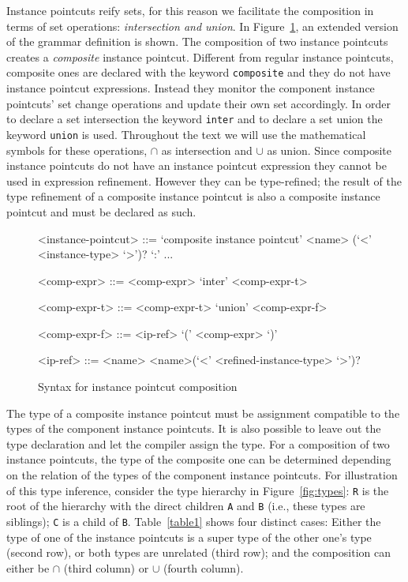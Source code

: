 \documentclass[10pt]{sigplanconf}
\newcommand{\lstinln}[1]{\lstinline~#1~}
\begin{document}
Instance pointcuts reify sets, for this reason we facilitate the composition in terms of set operations: \emph{intersection and union}.
In Figure~\ref{fig:grammar2}, an extended version of the grammar definition is shown.
The composition of two instance pointcuts creates a \emph{composite} instance pointcut. Different from regular instance pointcuts, composite ones are declared with the keyword \lstinln{composite} and they do not have instance pointcut expressions. Instead they monitor the component instance pointcuts' set change operations and update their own set accordingly.
In order to declare a set intersection the keyword \lstinln{inter} and to declare a set union the keyword \lstinln{union} is used. Throughout the text we will use the mathematical symbols for these operations, $\cap$ as intersection and $\cup$ as union. Since composite instance pointcuts do not have an instance pointcut expression they cannot be used in expression refinement. However they can be type-refined; the result of the type refinement of a composite instance pointcut is also a composite instance pointcut and must be declared as such.

\begin{figure}[h]
\begin{grammar}
<instance-pointcut> ::= `composite instance pointcut' <name> (`<' <instance-type> `>')? `:'
... 

<comp-expr> ::= <comp-expr> `inter' <comp-expr-t>  

<comp-expr-t> ::= <comp-expr-t> `union' <comp-expr-f>  

<comp-expr-f> ::= <ip-ref> \alt `(' <comp-expr> `)'

<ip-ref> ::= <name> \alt <name>(`<' <refined-instance-type> `>')?

\end{grammar}
\caption{Syntax for instance pointcut composition}
\label{fig:grammar2}
\end{figure}


The type of a composite instance pointcut must be assignment compatible to the types of the component instance pointcuts. It is also possible to leave out the type declaration and let the compiler assign the type.  For a composition of two instance pointcuts, the type of the composite one can be determined depending on the relation of the types of the component instance pointcuts. For illustration of this type inference, consider the type hierarchy in Figure~\ref{fig:types}: \lstinln{R} is the root of the hierarchy with the direct children \lstinln{A} and \lstinln{B} (i.e., these types are siblings); \lstinln{C} is a child of \lstinln{B}. Table~\ref{table1} shows four distinct cases: Either the type of one of the instance pointcuts is a super type of the other one's type (second row), or both types are unrelated (third row); and the composition can either be $\cap$ (third column) or $\cup$ (fourth column).
\end{document}
